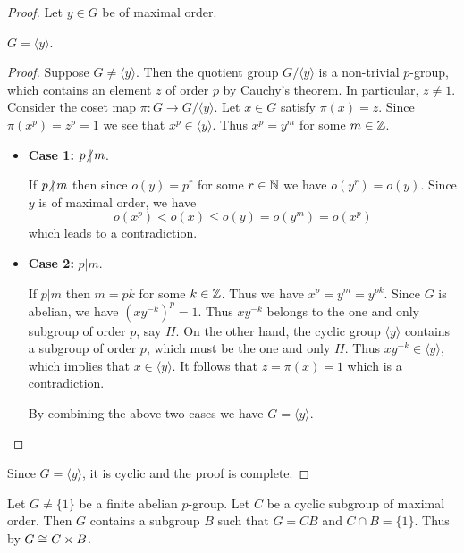 \documentclass[11pt]{article}
\begin{document}
\begin{proof}
    Let $y\in G$ be of maximal order.
    \begin{claim}
        $G=\langle y\rangle$.
    \end{claim}
    \begin{proof}
        Suppose $G\neq\langle y\rangle$. Then the quotient group $G/\langle y\rangle$ is a non-trivial $p$-group, which contains an element $z$ of order $p$ by Cauchy's theorem. In particular, $z\neq 1$. Consider the coset map $\pi:G\to G/\langle y\rangle$. Let $x\in G$ satisfy $\pi(x)=z$. Since $\pi(x^p)=z^p=1$ we see that $x^p\in\langle y\rangle$. Thus $x^p=y^m$ for some $m\in\mathbb{Z}$.

        \begin{itemize}
            \item\textbf{Case 1:} $p\hspace{-3pt}\not|\, m$.
    
            If $p\hspace{-3pt}\not|\, m$ then since $o(y)=p^r$ for some $r\in\mathbb{N}$ we have $o(y^r)=o(y)$. Since $y$ is of maximal order, we have
            \[o(x^p)<o(x)\leq o(y)=o(y^m)=o(x^p)\]
            which leads to a contradiction.
    
            \item\textbf{Case 2:} $p|m$.
    
            If $p|m$ then $m=pk$ for some $k\in\mathbb{Z}$. Thus we have $x^p=y^m=y^{pk}$. Since $G$ is abelian, we have $(xy^{-k})^p=1$. Thus $xy^{-k}$ belongs to the one and only subgroup of order $p$, say $H$. On the other hand, the cyclic group $\langle y\rangle$ contains a subgroup of order $p$, which must be the one and only $H$. Thus $xy^{-k}\in\langle y\rangle$, which implies that $x\in\langle y\rangle$. It follows that $z=\pi(x)=1$ which is a contradiction.
    
            By combining the above two cases we have $G=\langle y\rangle$.
        \end{itemize}
    \end{proof}
    Since $G=\langle y\rangle$, it is cyclic and the proof is complete.
\end{proof}

\begin{proposition}
        Let $G\neq\{1\}$ be a finite abelian $p$-group. Let $C$ be a cyclic subgroup of maximal order. Then $G$ contains a subgroup $B$ such that $G=CB$ and $C\cap B=\{1\}$. Thus by  $G\cong C\times B$.
\end{proposition}
\end{document}
